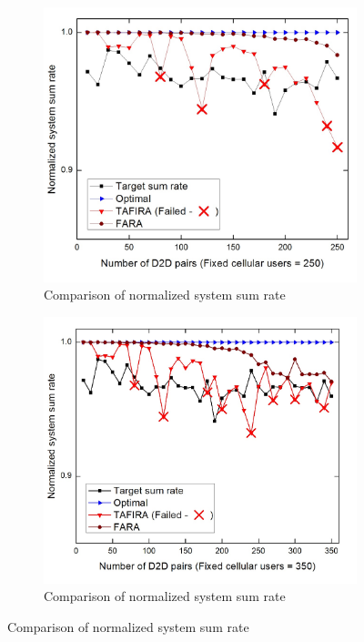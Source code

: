 \documentclass{ieeeaccess}
\begin{document}
\begin{figure}
{\begin{multicols}{2}
\begin{subfigure}{.86\linewidth}
 	\includegraphics[width=\linewidth]{Graph/sumrate_fara.jpg}\par
	\caption{Comparison of normalized system sum rate}
	\label{fig:sumrate_fair}
	\end{subfigure}
	
	\hspace{12pt}
	\begin{subfigure}{.86\linewidth}
 	\includegraphics[width=\linewidth]{Graph/sum_fara_350.jpg}\par
	\caption{Comparison of normalized system sum rate}
	\label{fig:sumrate_fair_350}
	\end{subfigure}
	\end{multicols}

}
\end{figure}
\end{document}
